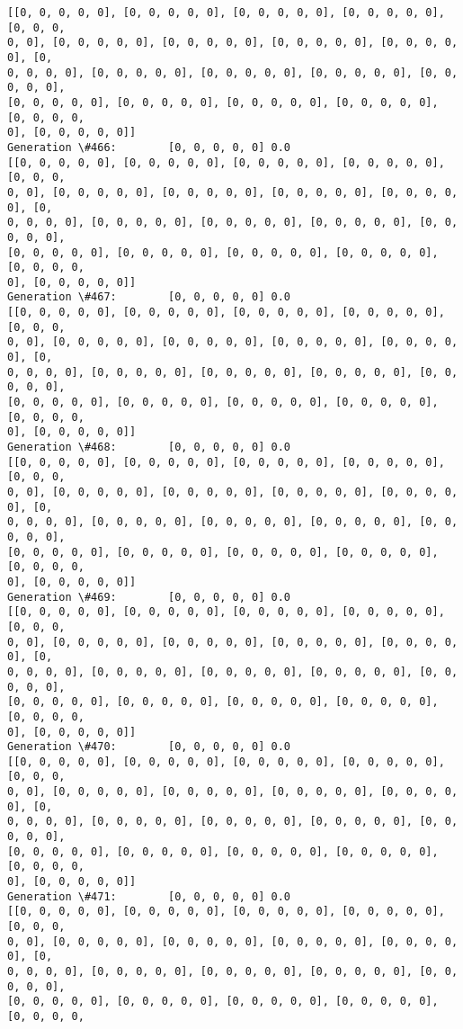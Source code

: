 \documentclass[11pt]{article}
\begin{document}
\begin{Verbatim}[commandchars=\\\{\}]
[[0, 0, 0, 0, 0], [0, 0, 0, 0, 0], [0, 0, 0, 0, 0], [0, 0, 0, 0, 0], [0, 0, 0,
0, 0], [0, 0, 0, 0, 0], [0, 0, 0, 0, 0], [0, 0, 0, 0, 0], [0, 0, 0, 0, 0], [0,
0, 0, 0, 0], [0, 0, 0, 0, 0], [0, 0, 0, 0, 0], [0, 0, 0, 0, 0], [0, 0, 0, 0, 0],
[0, 0, 0, 0, 0], [0, 0, 0, 0, 0], [0, 0, 0, 0, 0], [0, 0, 0, 0, 0], [0, 0, 0, 0,
0], [0, 0, 0, 0, 0]]
Generation \#466:        [0, 0, 0, 0, 0] 0.0
[[0, 0, 0, 0, 0], [0, 0, 0, 0, 0], [0, 0, 0, 0, 0], [0, 0, 0, 0, 0], [0, 0, 0,
0, 0], [0, 0, 0, 0, 0], [0, 0, 0, 0, 0], [0, 0, 0, 0, 0], [0, 0, 0, 0, 0], [0,
0, 0, 0, 0], [0, 0, 0, 0, 0], [0, 0, 0, 0, 0], [0, 0, 0, 0, 0], [0, 0, 0, 0, 0],
[0, 0, 0, 0, 0], [0, 0, 0, 0, 0], [0, 0, 0, 0, 0], [0, 0, 0, 0, 0], [0, 0, 0, 0,
0], [0, 0, 0, 0, 0]]
Generation \#467:        [0, 0, 0, 0, 0] 0.0
[[0, 0, 0, 0, 0], [0, 0, 0, 0, 0], [0, 0, 0, 0, 0], [0, 0, 0, 0, 0], [0, 0, 0,
0, 0], [0, 0, 0, 0, 0], [0, 0, 0, 0, 0], [0, 0, 0, 0, 0], [0, 0, 0, 0, 0], [0,
0, 0, 0, 0], [0, 0, 0, 0, 0], [0, 0, 0, 0, 0], [0, 0, 0, 0, 0], [0, 0, 0, 0, 0],
[0, 0, 0, 0, 0], [0, 0, 0, 0, 0], [0, 0, 0, 0, 0], [0, 0, 0, 0, 0], [0, 0, 0, 0,
0], [0, 0, 0, 0, 0]]
Generation \#468:        [0, 0, 0, 0, 0] 0.0
[[0, 0, 0, 0, 0], [0, 0, 0, 0, 0], [0, 0, 0, 0, 0], [0, 0, 0, 0, 0], [0, 0, 0,
0, 0], [0, 0, 0, 0, 0], [0, 0, 0, 0, 0], [0, 0, 0, 0, 0], [0, 0, 0, 0, 0], [0,
0, 0, 0, 0], [0, 0, 0, 0, 0], [0, 0, 0, 0, 0], [0, 0, 0, 0, 0], [0, 0, 0, 0, 0],
[0, 0, 0, 0, 0], [0, 0, 0, 0, 0], [0, 0, 0, 0, 0], [0, 0, 0, 0, 0], [0, 0, 0, 0,
0], [0, 0, 0, 0, 0]]
Generation \#469:        [0, 0, 0, 0, 0] 0.0
[[0, 0, 0, 0, 0], [0, 0, 0, 0, 0], [0, 0, 0, 0, 0], [0, 0, 0, 0, 0], [0, 0, 0,
0, 0], [0, 0, 0, 0, 0], [0, 0, 0, 0, 0], [0, 0, 0, 0, 0], [0, 0, 0, 0, 0], [0,
0, 0, 0, 0], [0, 0, 0, 0, 0], [0, 0, 0, 0, 0], [0, 0, 0, 0, 0], [0, 0, 0, 0, 0],
[0, 0, 0, 0, 0], [0, 0, 0, 0, 0], [0, 0, 0, 0, 0], [0, 0, 0, 0, 0], [0, 0, 0, 0,
0], [0, 0, 0, 0, 0]]
Generation \#470:        [0, 0, 0, 0, 0] 0.0
[[0, 0, 0, 0, 0], [0, 0, 0, 0, 0], [0, 0, 0, 0, 0], [0, 0, 0, 0, 0], [0, 0, 0,
0, 0], [0, 0, 0, 0, 0], [0, 0, 0, 0, 0], [0, 0, 0, 0, 0], [0, 0, 0, 0, 0], [0,
0, 0, 0, 0], [0, 0, 0, 0, 0], [0, 0, 0, 0, 0], [0, 0, 0, 0, 0], [0, 0, 0, 0, 0],
[0, 0, 0, 0, 0], [0, 0, 0, 0, 0], [0, 0, 0, 0, 0], [0, 0, 0, 0, 0], [0, 0, 0, 0,
0], [0, 0, 0, 0, 0]]
Generation \#471:        [0, 0, 0, 0, 0] 0.0
[[0, 0, 0, 0, 0], [0, 0, 0, 0, 0], [0, 0, 0, 0, 0], [0, 0, 0, 0, 0], [0, 0, 0,
0, 0], [0, 0, 0, 0, 0], [0, 0, 0, 0, 0], [0, 0, 0, 0, 0], [0, 0, 0, 0, 0], [0,
0, 0, 0, 0], [0, 0, 0, 0, 0], [0, 0, 0, 0, 0], [0, 0, 0, 0, 0], [0, 0, 0, 0, 0],
[0, 0, 0, 0, 0], [0, 0, 0, 0, 0], [0, 0, 0, 0, 0], [0, 0, 0, 0, 0], [0, 0, 0, 0,

\end{Verbatim}
\end{document}
